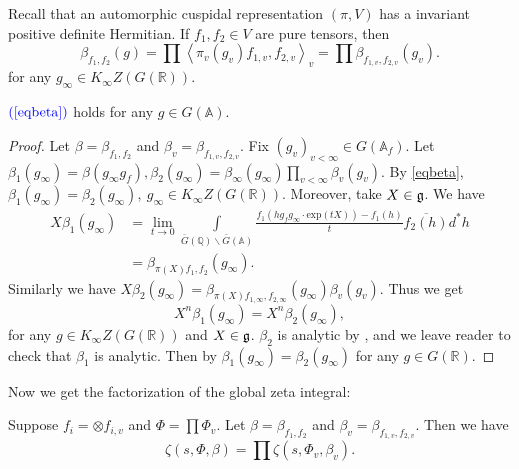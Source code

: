 Recall that an automorphic cuspidal representation $(\pi,V)$ has a invariant positive definite Hermitian. If $f_1,f_2\in V$ are pure tensors, then
\begin{equation}\label{eqbeta}
\beta_{f_1,f_2}(g)=\prod \left \langle \pi_v(g_v) f_{1,v}, f_{2,v} \right \rangle_v= \prod \beta_{f_{1,v}, f_{2,v}} (g_v).
\end{equation}
for any $g_\infty \in K_\infty Z(G(\mathbb R))$.

\begin{theorem}
$\textcolor{blue}{(\ref{eqbeta})}$ holds for any $g\in G(\mathbb A)$.
\end{theorem}

\begin{proof}
Let $\beta=\beta_{f_1,f_2}$ and $\beta_v=\beta_{f_{1,v}, f_{2,v}}$.
Fix $(g_v)_{v<\infty} \in G(\mathbb A_f)$. Let $\beta_1(g_\infty) =\beta(g_\infty g_f), \beta_2(g_\infty)=\beta_\infty (g_\infty)\prod_{v< \infty} \beta_v(g_v)$. By \ref{eqbeta}, $\beta_1(g_\infty)=\beta_2(g_\infty), \  g_\infty \in K_\infty Z(G(\mathbb R)).$ Moreover, take $X\in \mathfrak {g}$. We have
\begin{equation*}
\begin{split}
X \beta_1(g_\infty)&=\mathop{\mathrm{lim}}\limits_{t\to 0}\int\limits_{\bar G(\mathbb Q)\backslash \bar G(\mathbb A)} \frac {f_1(hg_f g_\infty\cdot \mathrm {exp} (tX))-f_1(h)} t \overline {f_2(h)} d^*h\\
&=\beta_{\pi(X) f_1,f_2} (g_\infty).
\end{split}
\end{equation*}
Similarly we have $X\beta_2(g_\infty)=\beta_{\pi (X) f_{1,\infty}, f_{2,\infty}}(g_\infty) \beta_v(g_v)$. Thus we get
\[
X^n \beta_1(g_\infty)=X^n \beta_2(g_\infty),
\]
for any $g\in K_\infty Z(G(\mathbb R))$ and $X\in \mathfrak g$. $\beta_2$ is analytic by \bl{\ref{analytic}}, and we leave reader to check that $\beta_1$ is analytic. Then by \bl{\ref{ana}} $\beta_1(g_\infty )=\beta_2(g_\infty)$ for any $g\in G(\mathbb R)$.
\end{proof}

Now we get the factorization of the global zeta integral:

\begin{theorem}\label{product}
Suppose $f_i=\otimes f_{i,v}$ and $\Phi=\prod \Phi_v$. Let $\beta=\beta_{f_1,f_2}$ and $\beta_v=\beta_{f_{1,v},f_{2,v}}$. Then we have
\[
\zeta(s,\Phi,\beta)=\prod \zeta(s,\Phi_v,\beta_v).
\]
\end{theorem}

